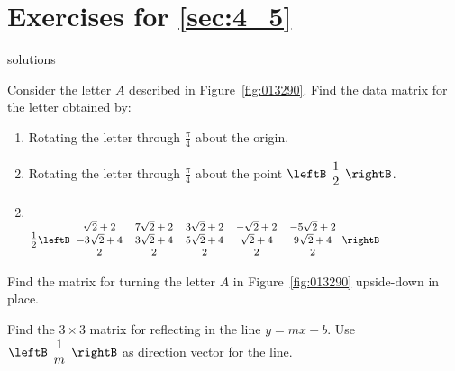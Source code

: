 \section*{Exercises for \ref{sec:4_5}}

\begin{Filesave}{solutions}
\end{Filesave}

\begin{multicols}{2}
\begin{ex}
Consider the letter $A$ described in Figure~\ref{fig:013290}. Find the data matrix for the letter obtained by:

\vspace{-1em}
\begin{enumerate}[label={\alph*.}]
\item Rotating the letter through $\frac{\pi}{4}$ about the origin.

\item Rotating the letter through $\frac{\pi}{4}$
 about the point $\leftB
 \begin{array}{c}
 1\\
 2
 \end{array}
 \rightB$.

\end{enumerate}
\begin{sol}
\begin{enumerate}[label={\alph*.}]
\setcounter{enumi}{1}
\item \hspace{1em} \\
\hspace*{-3em}${\footnotesize\frac{1}{2}\leftB
\begin{array}{ccccc}
\sqrt{2} + 2 & 7\sqrt{2} + 2 & 3\sqrt{2} + 2 & -\sqrt{2} + 2 & -5\sqrt{2} + 2\\
-3\sqrt{2} + 4 & 3\sqrt{2} + 4 & 5\sqrt{2} + 4 & \sqrt{2} + 4 & 9\sqrt{2} + 4 \\
2 & 2 & 2 & 2 & 2
\end{array}
\rightB}$

\end{enumerate}
\end{sol}
\end{ex}

\begin{ex}
Find the matrix for turning the letter $A$ in Figure~\ref{fig:013290} upside-down in place.
\end{ex}

\begin{ex}
Find the $3 \times 3$ matrix for reflecting in the line $y = mx + b$. Use $\leftB
\begin{array}{c}
1\\
m
\end{array}
\rightB$ as direction vector for the line.
\end{ex}


\end{multicols}
